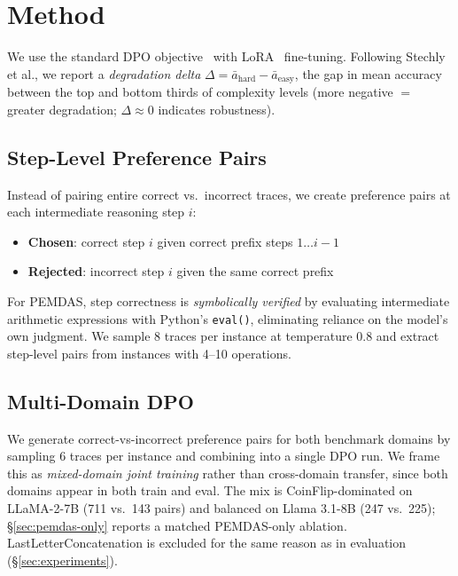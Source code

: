 \documentclass{article}
\begin{document}
\section{Method}

We use the standard DPO objective~\cite{rafailov2023dpo} with LoRA~\cite{hu2022lora} fine-tuning. Following Stechly et al., we report a \textit{degradation delta} $\Delta = \bar{a}_\mathrm{hard} - \bar{a}_\mathrm{easy}$, the gap in mean accuracy between the top and bottom thirds of complexity levels (more negative $=$ greater degradation; $\Delta \approx 0$ indicates robustness).

\subsection{Step-Level Preference Pairs}
\label{sec:method-step}

Instead of pairing entire correct vs.\ incorrect traces, we create preference pairs at each intermediate reasoning step $i$:
\begin{itemize}
  \item \textbf{Chosen}: correct step $i$ given correct prefix steps $1 \ldots i{-}1$
  \item \textbf{Rejected}: incorrect step $i$ given the same correct prefix
\end{itemize}
For PEMDAS, step correctness is \textit{symbolically verified} by evaluating intermediate arithmetic expressions with Python's \texttt{eval()}, eliminating reliance on the model's own judgment. We sample 8 traces per instance at temperature 0.8 and extract step-level pairs from instances with 4--10 operations.

\subsection{Multi-Domain DPO}

We generate correct-vs-incorrect preference pairs for both benchmark domains by sampling 6 traces per instance and combining into a single DPO run. We frame this as \emph{mixed-domain joint training} rather than cross-domain transfer, since both domains appear in both train and eval. The mix is CoinFlip-dominated on LLaMA-2-7B (711 vs.\ 143 pairs) and balanced on Llama 3.1-8B (247 vs.\ 225); §\ref{sec:pemdas-only} reports a matched PEMDAS-only ablation. LastLetterConcatenation is excluded for the same reason as in evaluation (§\ref{sec:experiments}).
\end{document}
